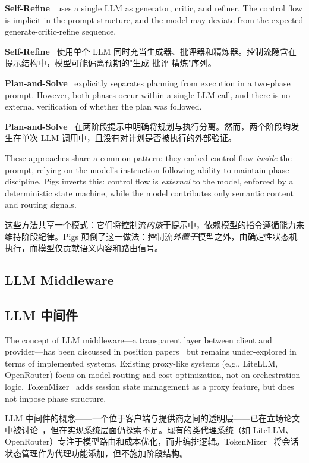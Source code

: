 \textbf{Self-Refine}~\citep{madaan2023selfrefine} uses a single LLM as generator, critic, and refiner. The control flow is implicit in the prompt structure, and the model may deviate from the expected generate-critic-refine sequence.
\begin{chinese}
\textbf{Self-Refine}~\citep{madaan2023selfrefine} 使用单个 LLM 同时充当生成器、批评器和精炼器。控制流隐含在提示结构中，模型可能偏离预期的"生成-批评-精炼"序列。
\end{chinese}

\textbf{Plan-and-Solve}~\citep{wang2023plan} explicitly separates planning from execution in a two-phase prompt. However, both phases occur within a single LLM call, and there is no external verification of whether the plan was followed.
\begin{chinese}
\textbf{Plan-and-Solve}~\citep{wang2023plan} 在两阶段提示中明确将规划与执行分离。然而，两个阶段均发生在单次 LLM 调用中，且没有对计划是否被执行的外部验证。
\end{chinese}

These approaches share a common pattern: they embed control flow \emph{inside} the prompt, relying on the model's instruction-following ability to maintain phase discipline. Pigs inverts this: control flow is \emph{external} to the model, enforced by a deterministic state machine, while the model contributes only semantic content and routing signals.
\begin{chinese}
这些方法共享一个模式：它们将控制流\emph{内嵌}于提示中，依赖模型的指令遵循能力来维持阶段纪律。Pigs 颠倒了这一做法：控制流\emph{外置于}模型之外，由确定性状态机执行，而模型仅贡献语义内容和路由信号。
\end{chinese}

\subsection{LLM Middleware}
\begin{chinese}
\subsection{LLM 中间件}
\end{chinese}

The concept of LLM middleware---a transparent layer between client and provider---has been discussed in position papers~\citep{dzanic2024middleware} but remains under-explored in terms of implemented systems. Existing proxy-like systems (e.g., LiteLLM, OpenRouter) focus on model routing and cost optimization, not on orchestration logic. TokenMizer~\citep{liu2026tokenmizer} adds session state management as a proxy feature, but does not impose phase structure.
\begin{chinese}
LLM 中间件的概念——一个位于客户端与提供商之间的透明层——已在立场论文中被讨论~\citep{dzanic2024middleware}，但在实现系统层面仍探索不足。现有的类代理系统（如 LiteLLM、OpenRouter）专注于模型路由和成本优化，而非编排逻辑。TokenMizer~\citep{liu2026tokenmizer} 将会话状态管理作为代理功能添加，但不施加阶段结构。
\end{chinese}

